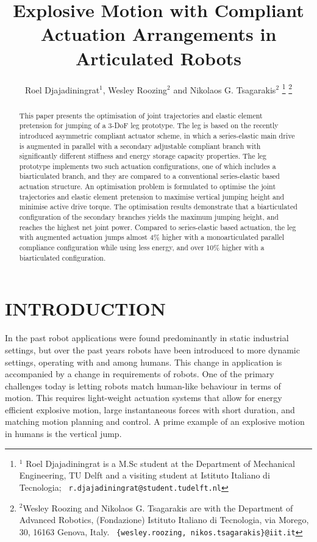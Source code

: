 \documentclass[letterpaper, 10 pt, conference]{ieeeconf}  %
\title{\LARGE \bf
	Explosive Motion with Compliant Actuation Arrangements in Articulated Robots
}
\author{Roel Djajadiningrat$^{1}$, Wesley Roozing$^{2}$ and Nikolaos G. Tsagarakis$^{2}$%
	\thanks{$^{1}$ Roel Djajadiningrat is a M.Sc student at the Department of Mechanical Engineering, TU Delft and a visiting student at Istituto Italiano di Tecnologia;
		{\tt\ r.djajadiningrat@student.tudelft.nl}
	}%
	\thanks{$^{2}$Wesley Roozing and Nikolaos G. Tsagarakis are with the Department of Advanced Robotics,
		(Fondazione) Istituto Italiano di Tecnologia, via Morego,
		30, 16163 Genova, Italy.
		{\tt\ \{wesley.roozing, nikos.tsagarakis\}@iit.it}
	}%
}
\begin{document}
\maketitle
\thispagestyle{empty}
\pagestyle{empty}


\begin{abstract}

This paper presents the optimisation of joint trajectories and elastic element pretension for jumping of a 3-DoF leg prototype. The leg is based on the recently introduced asymmetric compliant actuator scheme, in which a series-elastic main drive is augmented in parallel with a secondary adjustable compliant branch with significantly different stiffness and energy storage capacity properties. The leg prototype implements two such actuation configurations, one of which includes a biarticulated branch, and they are compared to a conventional series-elastic based actuation structure. An optimisation problem is formulated to optimise the joint trajectories and elastic element pretension to maximise vertical jumping height and minimise active drive torque. The optimisation results demonstrate that a biarticulated configuration of the secondary branches yields the maximum jumping height, and reaches the highest net joint power. Compared to series-elastic based actuation, the leg with augmented actuation jumps almost 4\% higher with a monoarticulated parallel compliance configuration while using less energy, and over 10\% higher with a biarticulated configuration.

\end{abstract}


\section{INTRODUCTION}
In the past robot applications were found predominantly in static industrial settings, but over the past years robots have been introduced to more dynamic settings, operating with and among humans. This change in application is accompanied by a change in requirements of robots. One of the primary challenges today is letting robots match human-like behaviour in terms of motion. This requires light-weight actuation systems that allow for energy efficient explosive motion, large instantaneous forces with short duration, and matching motion planning and control. A prime example of an explosive motion in humans is the vertical jump.
\end{document}
